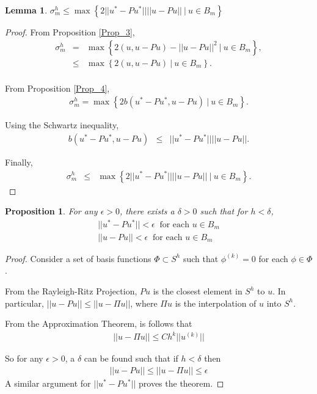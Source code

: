 \documentclass[../../main.tex]{subfiles}
\begin{document}
\newtheorem{Lem_2}[Lem_1]{Lemma} \label{Lem_2}
\begin{Lem_2}
	$\sigma_{m}^{h} \leq \max \left\{2||u^{*}- Pu^{*}|| ||u-Pu|| \ | \ u \in B_{m} \right\}$
\end{Lem_2}
\begin{proof}
	From Proposition \ref{Prop_3},
	\begin{eqnarray*}
		\sigma_{m}^{h} & = & \max\left\{ 2( u,u-Pu )-||u-Pu||^{2} \ | \ u \in B_{m} \right\}, \\
					& \leq & \max\left\{ 2( u,u-Pu ) \ | \ u \in B_{m} \right\}. \\
	\end{eqnarray*}

	From Proposition \ref{Prop_4}, 
	\begin{eqnarray*}
		\sigma_{m}^{h} = \max\left\{ 2 b(u^{*}-Pu^{*}, u-Pu) \ | \ u \in B_{m} \right\}.
	\end{eqnarray*}

	Using the Schwartz inequality,
	\begin{eqnarray*}
		b(u^{*} - Pu^{*}, u -Pu) & \leq & ||u^{*} - Pu^{*}||||u -Pu||.
	\end{eqnarray*}

	Finally,
	\begin{eqnarray*}
		\sigma_{m}^{h} & \leq & \max\left\{ 2||u^{*}- Pu^{*}|| ||u-Pu|| \ | \ u \in B_{m} \right\}.
	\end{eqnarray*}
\end{proof}

\newtheorem{Prop_5}[Prop_1]{Proposition} \label{Prop_5}
\begin{Prop_5}
	For any $\epsilon > 0$, there exists a $\delta >0$ such that for $h<\delta$,
	\begin{eqnarray*}
	||u^{*} - Pu^{*}|| < \epsilon \ \textrm{ for each } u \in B_{m}\\
	||u - Pu|| < \epsilon \ \textrm{ for each } u \in B_{m}
	\end{eqnarray*}
\end{Prop_5}
\begin{proof}
	Consider a set of basis functions $\Phi \subset S^h$ such that $\phi^(k) = 0$ for each $\phi \in \Phi$.

	From the Rayleigh-Ritz Projection, $Pu$ is the closest element in $S^h$ to $u$. In particular, $||u-Pu||\leq ||u-\Pi u||$, where $\Pi u$ is the interpolation of $u$ into $S^h$.
	
	From the Approximation Theorem, is follows that
	\begin{eqnarray*}
		||u - \Pi u|| \leq Ch^{k}||u^{(k)}||
	\end{eqnarray*}

	So for any $\epsilon > 0$, a $\delta$ can be found such that if $h<\delta$ then
	\begin{eqnarray*}
		||u - Pu|| \leq ||u - \Pi u|| \leq \epsilon
	\end{eqnarray*}
	A similar argument for $||u^{*} - Pu^{*}||$ proves the theorem.
\end{proof}
\end{document}
